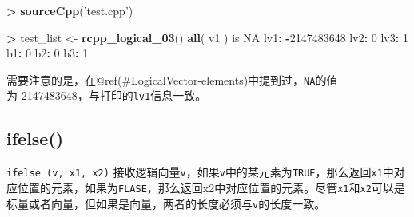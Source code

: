 \documentclass[]{ctexbook}
\newenvironment{Shaded}{\begin{snugshade}}{\end{snugshade}}
\newcommand{\KeywordTok}[1]{\textcolor[rgb]{0.13,0.29,0.53}{\textbf{#1}}}
\newcommand{\DecValTok}[1]{\textcolor[rgb]{0.00,0.00,0.81}{#1}}
\newcommand{\StringTok}[1]{\textcolor[rgb]{0.31,0.60,0.02}{#1}}
\newcommand{\OtherTok}[1]{\textcolor[rgb]{0.56,0.35,0.01}{#1}}
\newcommand{\OperatorTok}[1]{\textcolor[rgb]{0.81,0.36,0.00}{\textbf{#1}}}
\newcommand{\NormalTok}[1]{#1}
\begin{document}
\begin{Shaded}
\begin{Highlighting}[]
\OperatorTok{>}\StringTok{ }\KeywordTok{sourceCpp}\NormalTok{(}\StringTok{'test.cpp'}\NormalTok{)}

\OperatorTok{>}\StringTok{ }\NormalTok{test_list <-}\StringTok{ }\KeywordTok{rcpp_logical_03}\NormalTok{()}
\KeywordTok{all}\NormalTok{( v1 ) is }\OtherTok{NA}
\NormalTok{lv1}\OperatorTok{:}\StringTok{ }\OperatorTok{-}\DecValTok{2147483648}
\NormalTok{lv2}\OperatorTok{:}\StringTok{ }\DecValTok{0}
\NormalTok{lv3}\OperatorTok{:}\StringTok{ }\DecValTok{1}
\NormalTok{b1}\OperatorTok{:}\StringTok{ }\DecValTok{0}
\NormalTok{b2}\OperatorTok{:}\StringTok{ }\DecValTok{0}
\NormalTok{b3}\OperatorTok{:}\StringTok{ }\DecValTok{1}
\end{Highlighting}
\end{Shaded}

需要注意的是，在@ref(\#LogicalVector-elements)中提到过，\texttt{NA}的值为-2147483648，与打印的\texttt{lv1}信息一致。

\subsection{ifelse()}\label{ifelse}

\texttt{ifelse\ (v,\ x1,\ x2)}
接收逻辑向量\texttt{v}，如果\texttt{v}中的某元素为\texttt{TRUE}，那么返回\texttt{x1}中对应位置的元素，如果为\texttt{FLASE}，那么返回x2中对应位置的元素。尽管\texttt{x1}和\texttt{x2}可以是标量或者向量，但如果是向量，两者的长度必须与\texttt{v}的长度一致。
\end{document}
